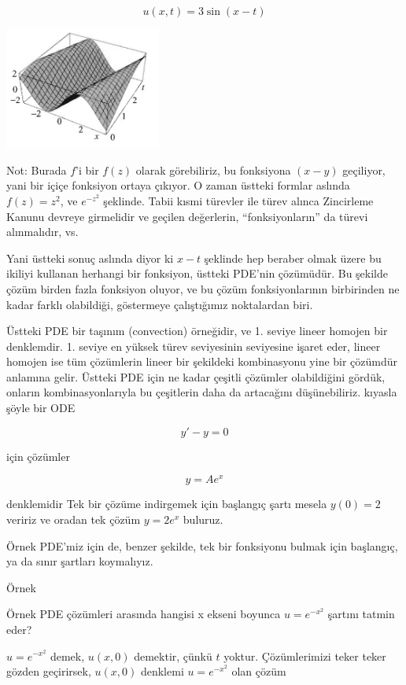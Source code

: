 \documentclass[12pt,fleqn]{article}\usepackage{../../common}
\begin{document}
$$ u(x,t) = 3\sin(x-t) $$

\includegraphics[height=4cm]{1_4.png}

Not: Burada $f$'i bir $f(z)$ olarak görebiliriz, bu fonksiyona $(x-y)$
geçiliyor, yani bir içiçe fonksiyon ortaya çıkıyor. O zaman üstteki formlar
aslında $f(z) = z^2$, ve $e^{-z^2}$ şeklinde. Tabii kısmi türevler ile
türev alınca Zincirleme Kanunu devreye girmelidir ve geçilen değerlerin,
``fonksiyonların'' da türevi alınmalıdır, vs. 

Yani üstteki sonuç aslında diyor ki $x-t$ şeklinde hep beraber olmak üzere
bu ikiliyi kullanan herhangi bir fonksiyon, üstteki PDE'nin çözümüdür. Bu
şekilde çözüm birden fazla fonksiyon oluyor, ve bu çözüm fonksiyonlarının
birbirinden ne kadar farklı olabildiği, göstermeye çalıştığımız noktalardan
biri.

Üstteki PDE bir taşınım (convection) örneğidir, ve 1. seviye lineer homojen
bir denklemdir. 1. seviye en yüksek türev seviyesinin seviyesine işaret
eder, lineer homojen ise tüm çözümlerin lineer bir şekildeki kombinasyonu
yine bir çözümdür anlamına gelir. Üstteki PDE için ne kadar çeşitli
çözümler olabildiğini gördük, onların kombinasyonlarıyla bu çeşitlerin daha
da artacağını düşünebiliriz. kıyasla şöyle bir ODE 

$$  y' - y  = 0$$

için çözümler

$$ y = Ae^x $$

denklemidir Tek bir çözüme indirgemek için başlangıç şartı mesela $y(0) =2$ 
veririz ve oradan tek çözüm $y = 2e^x$ buluruz. 

Örnek PDE'miz için de, benzer şekilde, tek bir fonksiyonu bulmak için
başlangıç, ya da sınır şartları koymalıyız. 

Örnek

Örnek PDE çözümleri arasında hangisi x ekseni boyunca $u = e^{-x^2}$
şartını tatmin eder? 

$u = e^{-x^2}$ demek, $u(x,0)$ demektir, çünkü $t$ yoktur. Çözümlerimizi
teker teker gözden geçirirsek, $u(x,0)$ denklemi $u = e^{-x^2}$ olan
çözüm
\end{document}
